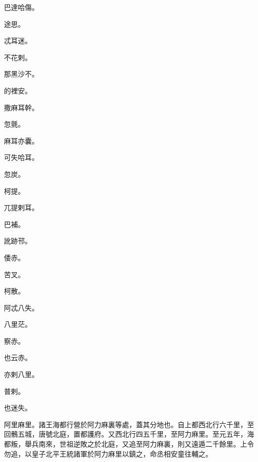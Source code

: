\begin{pinyinscope}
 巴達哈傷。



 途思。



 忒耳迷。



 不花剌。



 那黑沙不。



 的裡安。



 撒麻耳幹。



 忽氈。



 麻耳亦囊。



 可失哈耳。



 忽炭。



 柯提。



 兀提剌耳。



 巴補。



 訛跡邗。



 倭赤。



 苦叉。



 柯散。



 阿忒八失。



 八里茫。



 察赤。



 也云赤。



 亦剌八里。



 普剌。



 也迷失。



 阿里麻里。諸王海都行營於阿力麻裏等處，蓋其分地也。自上都西北行六千里，至回鶻五城，唐號北庭，置都護府。又西北行四五千里，至阿力麻里。至元五年，海都叛，舉兵南來，世祖逆敗之於北庭，又追至阿力麻裏，則又遠遁二千餘里。上令勿追，以皇子北平王統諸軍於阿力麻里以鎮之，命丞相安童往輔之。




\end{pinyinscope}
